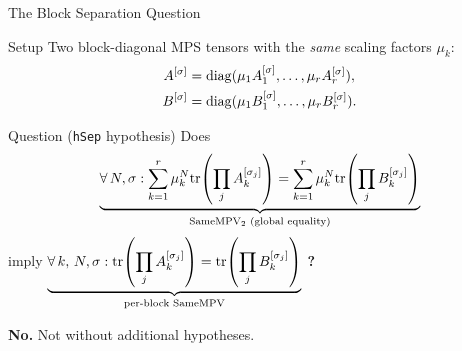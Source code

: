 \documentclass[aspectratio=169,10pt]{beamer}
\begin{document}
\begin{frame}{The Block Separation Question}
\vspace{-0.5em}

\begin{block}{Setup}
Two block-diagonal MPS tensors with the \emph{same} scaling factors $\mu_k$:
\begin{align*}
  A^{[\sigma]} &= \mathrm{diag}(\mu_1 A_1^{[\sigma]}, \dots, \mu_r A_r^{[\sigma]}), \\
  B^{[\sigma]} &= \mathrm{diag}(\mu_1 B_1^{[\sigma]}, \dots, \mu_r B_r^{[\sigma]}).
\end{align*}
\end{block}

\begin{block}{Question (\texttt{hSep} hypothesis)}
Does
\[
  \underbrace{%
    \forall\,N, \sigma: 
    \sum_{k=1}^r \mu_k^N \tr\!\left(\prod_j A_k^{[\sigma_j]}\right)
    = 
    \sum_{k=1}^r \mu_k^N \tr\!\left(\prod_j B_k^{[\sigma_j]}\right)
  }_{\text{SameMPV}_2 \text{ (global equality)}}
\]
imply \quad
$
  \underbrace{%
    \forall\,k,\,N, \sigma: 
    \tr\!\left(\prod_j A_k^{[\sigma_j]}\right) = \tr\!\left(\prod_j B_k^{[\sigma_j]}\right)
  }_{\text{per-block SameMPV}}
$ \textbf{?}
\end{block}

\vspace{0.3em}
\begin{center}
\textcolor{softred}{\large\textbf{No.}} \quad
\textcolor{dimwhite}{Not without additional hypotheses.}
\end{center}
\end{frame}
\end{document}
